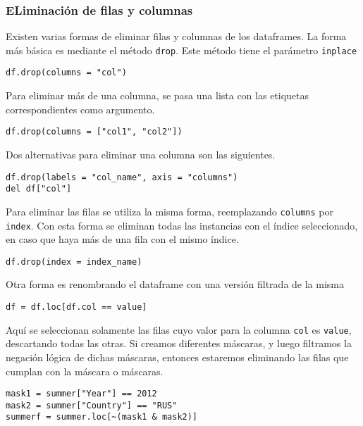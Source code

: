 \subsubsection{ELiminación de filas y columnas}
Existen varias formas de eliminar filas y columnas de los dataframes. La forma más básica es mediante el método \texttt{drop}. Este método tiene el parámetro \texttt{inplace}
\begin{verbatim}
df.drop(columns = "col")    
\end{verbatim}
Para eliminar más de una columna, se pasa una lista con las etiquetas correspondientes como argumento.
\begin{verbatim}
df.drop(columns = ["col1", "col2"])    
\end{verbatim}
Dos alternativas para eliminar una columna son las siguientes.
\begin{verbatim}
df.drop(labels = "col_name", axis = "columns")
del df["col"]
\end{verbatim}
Para eliminar las filas se utiliza la misma forma, reemplazando \texttt{columns} por \texttt{index}. Con esta forma se eliminan todas las instancias con el índice seleccionado, en caso que haya más de una fila con el mismo índice.
\begin{verbatim}
df.drop(index = index_name)
\end{verbatim}
Otra forma es renombrando el dataframe con una versión filtrada de la misma
\begin{verbatim}
df = df.loc[df.col == value]
\end{verbatim}
Aquí se seleccionan solamente las filas cuyo valor para la columna \texttt{col} es \texttt{value}, descartando todas las otras. 
Si creamos diferentes máscaras, y luego filtramos la negación lógica de dichas máscaras, entonces estaremos eliminando las filas que cumplan con la máscara o máscaras.
\begin{verbatim}
mask1 = summer["Year"] == 2012
mask2 = summer["Country"] == "RUS"
summerf = summer.loc[~(mask1 & mask2)]
\end{verbatim}
